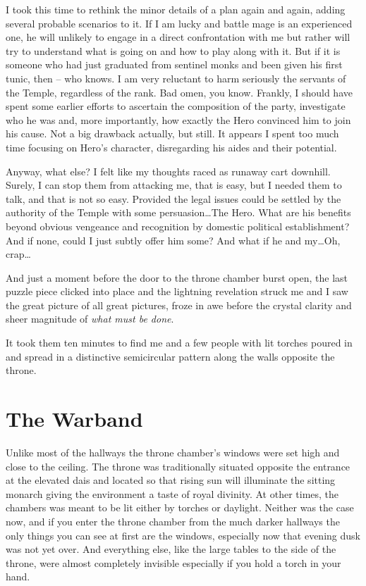 I took this time to rethink the minor details of a plan again and again, adding several probable scenarios to it. If I am lucky and battle mage is an experienced one, he will unlikely to engage in a direct confrontation with me but rather will try to understand what is going on and how to play along with it. But if it is someone who had just graduated from sentinel monks and been given his first tunic, then -- who knows. I am very reluctant to harm seriously the servants of the Temple, regardless of the rank. Bad omen, you know. Frankly, I should have spent some earlier efforts to ascertain the composition of the party, investigate who he was and, more importantly, how exactly the Hero convinced him to join his cause. Not a big drawback actually, but still. It appears I spent too much time focusing on Hero's character, disregarding his aides and their potential.

Anyway, what else? I felt like my thoughts raced as runaway cart downhill. Surely, I can stop them from attacking me, that is easy, but I needed them to talk, and that is not so easy. Provided the legal issues could be settled by the authority of the Temple with some persuasion\dots The Hero. What are his benefits beyond obvious vengeance and recognition by domestic political establishment? And if none, could I just subtly offer him some? And what if he and my\dots Oh, crap\dots

And just a moment before the door to the throne chamber burst open, the last puzzle piece clicked into place and the lightning revelation struck me and I saw the great picture of all great pictures, froze in awe before the crystal clarity and sheer magnitude of \textit{what must be done}.

It took them ten minutes to find me and a few people with lit torches poured in and spread in a distinctive semicircular pattern along the walls opposite the throne.

\section{The Warband}

Unlike most of the hallways the throne chamber’s windows were set high and close to the ceiling. The throne was traditionally situated opposite the entrance at the elevated dais and located so that rising sun will illuminate the sitting monarch giving the environment a taste of royal divinity. At other times, the chambers was meant to be lit either by torches or daylight. Neither was the case now, and if you enter the throne chamber from the much darker hallways the only things you can see at first are the windows, especially now that evening dusk was not yet over. And everything else, like the large tables to the side of the throne, were almost completely invisible especially if you hold a torch in your hand.

